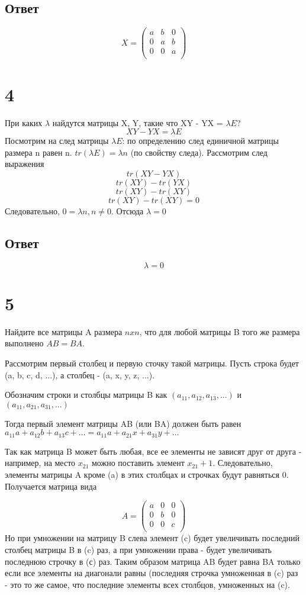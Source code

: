 \documentclass[a4paper]{article}
\begin{document}
\subsection*{Ответ}
\begin{equation*}
X = 
\begin{pmatrix}
a &b&0\\
0&a&b\\
0&0&a\\
\end{pmatrix}
\end{equation*}


\section*{4}
При каких $\lambda$ найдутся матрицы X, Y, такие что XY - YX = $\lambda E$?
$$XY - YX = \lambda E$$
Посмотрим на след матрицы $\lambda E$: по определению след единичной матрицы размера n равен n. $tr(\lambda E) = \lambda n$ (по свойству следа).
Рассмотрим след выражения
$$tr(XY - YX)$$
$$tr(XY) - tr(YX)$$
$$tr(XY) - tr(XY)$$
$$tr(XY) - tr(XY) = 0$$
Следовательно, $0 = \lambda n, n \neq 0$. Отсюда $\lambda = 0$
\subsection*{Ответ}
$$\lambda = 0$$

\section*{5}
Найдите все матрицы A размера $nxn$, что для любой матрицы B того же размера выполнено $AB = BA$.

Рассмотрим первый столбец и первую сточку такой матрицы. Пусть строка будет (a, b, c, d, ...), а столбец - (a, x, y, z, ...).

Обозначим строки и столбцы матрицы B как $(a_{11}, a_{12}, a_{13},...)$ и $(a_{11}, a_{21}, a_{31},...)$

Тогда первый элемент матрицы AB (или BA) должен быть равен $a_{11}a + a_{12}b +  a_{13}c + ... = a_{11}a + a_{21}x+ a_{31}y + ...$

Так как матрица B может быть любая, все ее элементы не зависят друг от друга - например, на место $x_{21}$ можно поставить элемент $x_{21} + 1$. Следовательно, элементы матрицы A кроме (a) в этих столбцах и строчках будут равняться 0.
Получается матрица вида 

\begin{equation*}
A = 
\begin{pmatrix}
a &0&0\\
0&b&0\\
0&0&c\\
\end{pmatrix}
\end{equation*}
Но при умножении на матрицу B слева элемент (c) будет увеличивать последний столбец матрицы B в (c) раз, а при умножении права - будет увеличивать последнюю строчку в (с) раз. Таким образом матрица AB будет равна BA только если все элементы на диагонали равны (последняя строчка умноженная в (c) раз - это то же самое, что последние элементы всех столбцов, умноженных на (c).
\end{document}
